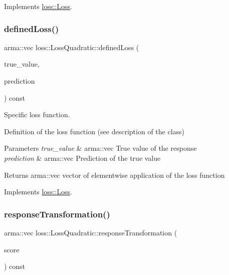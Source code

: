 Implements \hyperlink{classloss_1_1_loss_a267a4de70747ade4b2d84ce35a448979}{loss\+::\+Loss}.

\mbox{\label{classloss_1_1_loss_quadratic_a7495a0d225ae5470840e8f377419d7cf}} 
\subsubsection{\texorpdfstring{defined\+Loss()}{definedLoss()}}
{\footnotesize\ttfamily arma\+::vec loss\+::\+Loss\+Quadratic\+::defined\+Loss (\begin{DoxyParamCaption}\item[{const arma\+::vec \&}]{true\+\_\+value,  }\item[{const arma\+::vec \&}]{prediction }\end{DoxyParamCaption}) const\hspace{0.3cm}{\ttfamily [virtual]}}



Specific loss function. 

Definition of the loss function (see description of the class)


\begin{DoxyParams}{Parameters}
{\em true\+\_\+value} & {\ttfamily arma\+::vec} True value of the response \\
\hline
{\em prediction} & {\ttfamily arma\+::vec} Prediction of the true value\\
\hline
\end{DoxyParams}
\begin{DoxyReturn}{Returns}
{\ttfamily arma\+::vec} vector of elementwise application of the loss function 
\end{DoxyReturn}


Implements \hyperlink{classloss_1_1_loss_ae9f94dd9b8311397583ba3a9cb485e94}{loss\+::\+Loss}.

\mbox{\label{classloss_1_1_loss_quadratic_a2534e3ec615acd6d0c80c2dbcfb8c1e9}} 
\subsubsection{\texorpdfstring{response\+Transformation()}{responseTransformation()}}
{\footnotesize\ttfamily arma\+::vec loss\+::\+Loss\+Quadratic\+::response\+Transformation (\begin{DoxyParamCaption}\item[{const arma\+::vec \&}]{score }\end{DoxyParamCaption}) const\hspace{0.3cm}{\ttfamily [virtual]}}



